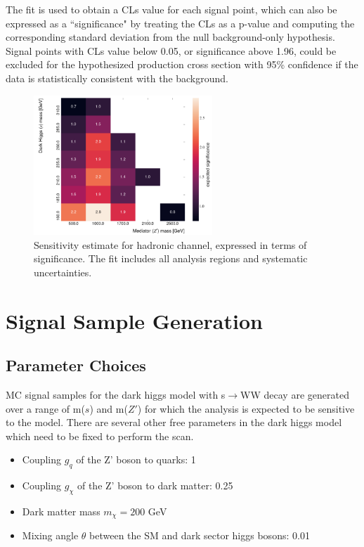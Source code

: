 \documentclass[12pt]{article}
\begin{document}
The fit is used to obtain a CLs value \cite{PDG_stats} for each signal point, which can also be expressed as a ``significance" by treating the CLs as a p-value and computing the corresponding standard deviation from the null background-only hypothesis. Signal points with CLs value below 0.05, or significance above 1.96, could be excluded for the hypothesized production cross section with 95\% confidence if the data is statistically consistent with the background. 

\begin{figure}[H]
     \centering
     \includegraphics[width=0.6\textwidth]{figures/had_sensitivity.png}
\caption[]{Sensitivity estimate for hadronic channel, expressed in terms of significance. The fit includes all analysis regions and systematic uncertainties.}
\label{fig:sensitivity}
\end{figure}

\section{Signal Sample Generation}

\subsection{Parameter Choices}

MC signal samples for the dark higgs model with s$\rightarrow$WW decay are generated over a range of m($s$) and m($Z'$) for which the analysis is expected to be sensitive to the model. There are several other free parameters in the dark higgs model which need to be fixed to perform the scan. 

\begin{itemize}
	\item Coupling $g_{q}$ of the Z' boson to quarks: 1 
	\item Coupling $g_{\chi}$ of the Z' boson to dark matter: 0.25
	\item Dark matter mass $m_{\chi} = 200$ GeV
	\item Mixing angle $\theta$ between the SM and dark sector higgs bosons: 0.01
\end{itemize}
\end{document}
